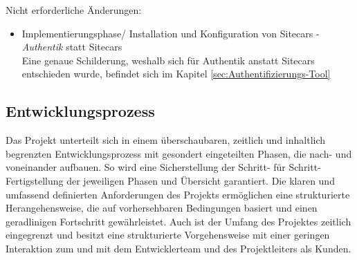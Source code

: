 Nicht erforderliche Änderungen:
\begin{itemize} [label=--]
	\item Implementierungsphase/ Installation und Konfiguration von Sitecars - \textit{Authentik} statt Sitecars
	\\Eine genaue Schilderung, weshalb sich für Authentik anstatt Sitecars entschieden wurde, befindet sich im 
	Kapitel \ref*{sec:Authentifizierungs-Tool} 
\end{itemize}

\subsection{Entwicklungsprozess}
\label{sec:Entwicklungsprozess}
Das Projekt unterteilt sich in einem überschaubaren, zeitlich und inhaltlich begrenzten Entwicklungsprozess 
mit gesondert eingeteilten Phasen, die nach- und voneinander aufbauen. So wird eine Sicherstellung der Schritt- 
für Schritt-Fertigstellung der jeweiligen Phasen und Übersicht garantiert. Die klaren und umfassend 
definierten Anforderungen des Projekts ermöglichen eine strukturierte Herangehensweise, die auf 
vorhersehbaren Bedingungen basiert und einen geradlinigen Fortschritt gewährleistet. Auch ist der 
Umfang des Projektes zeitlich eingegrenzt und besitzt eine strukturierte Vorgehensweise mit einer 
geringen Interaktion zum und mit dem Entwicklerteam und des Projektleiters als Kunden.